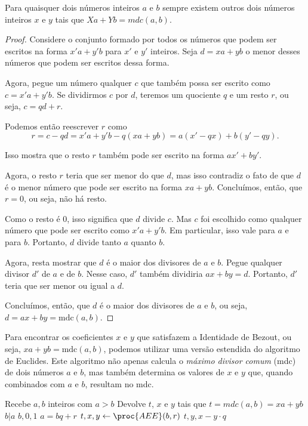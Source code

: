 \begin{proposition}
  Para quaisquer dois números inteiros $a$ e $b$ sempre existem outros dois números inteiros $x$ e $y$ tais que $Xa + Yb = mdc(a,b)$.
\end{proposition}
\begin{proof}
Considere o conjunto formado por todos os números que podem ser escritos na forma $x'a + y'b$ para $x'$ e $y'$ inteiros.
Seja $d = xa + yb$ o menor desses números que podem ser escritos dessa forma.

Agora, pegue um número qualquer $c$ que também possa ser escrito como $c = x'a + y'b$.
Se dividirmos $c$ por $d$, teremos um quociente $q$ e um resto $r$, ou seja, $c = qd + r$.

Podemos então reescrever $r$ como
\begin{displaymath}
r = c - qd = x'a + y'b - q(xa + yb) = a(x' - qx) + b(y' - qy).
\end{displaymath}

Isso mostra que o resto $r$ também pode ser escrito na forma $ax' + by'$.

Agora, o resto $r$ teria que ser menor do que $d$, mas isso contradiz o fato de que $d$ é o menor número que pode ser escrito na forma $xa + yb$.
Concluímos, então, que $r = 0$, ou seja, não há resto.

Como o resto é 0, isso significa que $d$ divide $c$.
Mas $c$ foi escolhido como qualquer número que pode ser escrito como $x'a + y'b$.
Em particular, isso vale para $a$ e para $b$.
Portanto, $d$ divide tanto $a$ quanto $b$.

Agora, resta mostrar que $d$ é o maior dos divisores de $a$ e $b$.
Pegue qualquer divisor $d'$ de $a$ e de $b$.
Nesse caso, $d'$ também dividiria $ax + by = d$.
Portanto, $d'$ teria que ser menor ou igual a $d$.

Concluímos, então, que $d$ é o maior dos divisores de $a$ e $b$, ou seja, $d = ax + by = \text{mdc}(a,b)$.
\end{proof}


Para encontrar os coeficientes $x$ e $y$ que satisfazem a Identidade de Bezout, ou seja, $xa + yb = \text{mdc}(a, b)$, podemos utilizar uma versão estendida do algoritmo de Euclides.
Este algoritmo não apenas calcula o {\em máximo divisor comum} (mdc) de dois números $a$ e $b$, mas também determina os valores de $x$ e $y$ que, quando combinados com $a$ e $b$, resultam no mdc.

\begin{codebox}
\li \Comment Recebe $a, b$ inteiros com $a > b$
\li \Comment Devolve $t$, $x$ e $y$ tais que $t = mdc(a,b) = xa + yb$
\li \If $b|a$
\li     \Then
        \Return $b, 0, 1$
\li \Comment $a = bq + r$
\li \Else $t, x, y \gets \proc{AEE}(b, r)$
\li     \Return $t, y, x - y \cdot q$
\End
\end{codebox}

